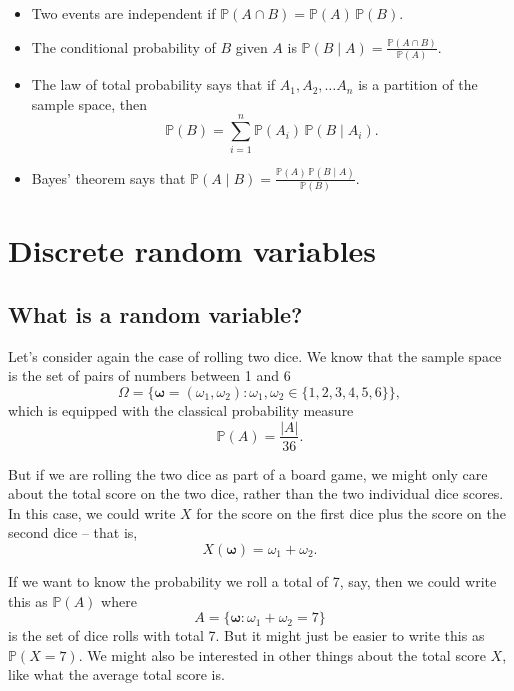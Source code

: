 \documentclass[
  a4paper,
]{book}
\providecommand{\tightlist}{%
  \setlength{\itemsep}{0pt}\setlength{\parskip}{0pt}}
\theoremstyle{definition}
\theoremstyle{definition}
\theoremstyle{definition}
\theoremstyle{definition}
\theoremstyle{remark}
\begin{document}
\begin{itemize}
\tightlist
\item
  Two events are independent if \(\mathbb P(A \cap B) = \mathbb P(A)\, \mathbb P(B)\).
\item
  The conditional probability of \(B\) given \(A\) is \({\displaystyle \mathbb P(B \mid A) = \frac{\mathbb P(A \cap B)}{\mathbb P(A)}}\).
\item
  The law of total probability says that if \(A_1, A_2, \dots A_n\) is a partition of the sample space, then
  \[ \mathbb P(B) = \sum_{i=1}^n \mathbb P(A_i) \, \mathbb P(B \mid A_i) . \]
\item
  Bayes' theorem says that \({\displaystyle \mathbb P(A \mid B) = \frac{\mathbb P(A) \,\mathbb P(B \mid A)}{\mathbb P(B)} }\).
\end{itemize}

\hypertarget{S05-discrete-rv}{%
\chapter{Discrete random variables}\label{S05-discrete-rv}}

\hypertarget{rv}{%
\section{What is a random variable?}\label{rv}}

Let's consider again the case of rolling two dice. We know that the sample space is the set of pairs of numbers between 1 and 6
\[  \Omega = \big\{ \boldsymbol\omega = (\omega_1, \omega_2) : \omega_1, \omega_2 \in \{1,2,3,4,5,6\} \big\} , \]
which is equipped with the classical probability measure
\[ \mathbb P(A) = \frac{|A|}{36} . \]

But if we are rolling the two dice as part of a board game, we might only care about the total score on the two dice, rather than the two individual dice scores. In this case, we could write \(X\) for the score on the first dice plus the score on the second dice -- that is,
\[ X(\boldsymbol\omega) = \omega_1 + \omega_2 . \]

If we want to know the probability we roll a total of 7, say, then we could write this as \(\mathbb P(A)\) where
\[ A = \{ \boldsymbol\omega : \omega_1 + \omega_2 = 7\}  \]
is the set of dice rolls with total 7.
But it might just be easier to write this as \(\mathbb P(X = 7)\). We might also be interested in other things about the total score \(X\), like what the average total score is.
\end{document}
